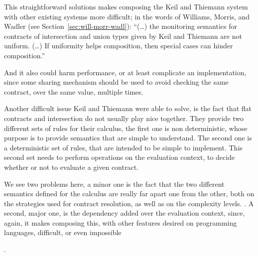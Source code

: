 \documentclass[sigplan,10pt,review,anonymous]{acmart}
\newcommand{\unsure}[2][1=]{}
\newcommand{\info}[2][1=]{}
\begin{document}
This straightforward solutions makes composing the Keil and Thiemann
system with other existing systems more difficult; in the words
of Williams, Morris, and Wadler (see Section~\ref{sec:will-morr-wadl}):
``(\ldots) the monitoring semantics for contracts of intersection and union types given by Keil
and Thiemann are not uniform. (\ldots) If uniformity helps composition, then
special cases can hinder composition.''\cite{RootCauseOfBlame}
\info{(Yann) Does
it also make it less efficient? If $(A \& B)$ fails because of $B$, their
development causes to recheck the contract $A$ that has been duplicated?}
And it also could harm performance, or at least complicate an implementation,
since some sharing mechanism should be used to avoid checking the same contract,
over the same value, multiple times.\unsure{Arnaud says: this whole
  section is too abstract give concrete code and explain what goes
  wrong. It's fine to give code in Nickel syntax}

Another difficult issue Keil and Thiemann were able to solve, is the
fact that flat contracts and intersection do not usually play nice
together.
They provide two different sets of rules for their calculus,
the first one is non deterministic, whose purpose is to provide
semantics that are simple to understand.
The second one is a deterministic set of rules, that are intended
to be simple to implement.
This second set needs to perform operations
on the evaluation context, to decide whether or not to evaluate
a given contract.
\unsure{Worth showing how the non deterministic version works? (See section B.1.1)
try with an example}

We see two problems here, a minor one is the fact that the two
different semantics defined for the calculus are really far apart
one from the other, both on the strategies used for contract resolution,
as well as on the complexity levels.
\unsure{(Yann) Is it really a
    problem per se? It is common thing to do (a nice declarative system
    for proofs and an algorithmic one for implementation, proved equivalent).
    Maybe the point is that the algorithmic system is way more complex than the
declarative one
(Teo) reworded}.
A second, major one,
is the dependency added over the evaluation context, since, again,
it makes composing this, with other features desired on programming languages,
difficult, or even impossible
\unsure{(Yann) I think we need to substantiate this claim. If this
context dependency explains why CSE is invalid, maybe have a little example?
(Teo) I removed it, I don't think there's an example, mainly since
this context dependency is not part of the language. I do think it complicates
implementation of said feature}
.
\end{document}
